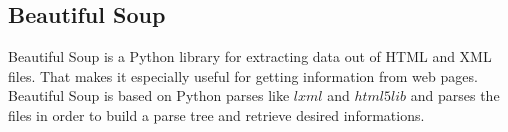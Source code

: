 \subsection{Beautiful Soup}\label{sec:BackgroundBeautifulSoup}

Beautiful Soup is a Python library for extracting data out of HTML and XML files. That makes it especially useful for getting information from web pages. Beautiful Soup is based on Python parses like $lxml$ and $html5lib$ and parses the files in order to build a parse tree and retrieve desired informations. \cite{BeautifulSoup,BeautifulSoupDoku}